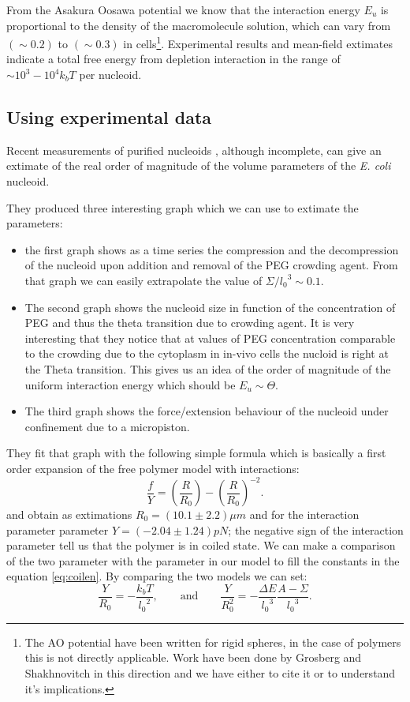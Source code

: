 \documentclass[12pt,a4paper,notitlepage]{article}
\newcommand{\ecoli}{\emph{E. coli}\xspace}
\begin{document}
From the Asakura Oosawa potential \cite{Asakura1958} we know that the
interaction energy $E_u$ is proportional to the density of the
macromolecule solution, which can vary from $(\sim 0.2)$ to $(\sim
0.3)$ in cells\footnote{
  The AO potential have been written for rigid spheres, in the case of
  polymers this is not directly applicable. Work have been done by
  Grosberg and Shakhnovitch in this direction\cite{Grosberg1982} and
  we have either to cite it or to understand it's implications.}.
Experimental results and mean-field extimates indicate a total free
energy from depletion interaction in the range of $\sim 10^3-10^4 k_b
T$ per nucleoid\cite{Kojima2006}.

\subsection{Using experimental data}
Recent measurements of purified nucleoids \cite{Pelletier2012}, although
incomplete, can give an extimate of the real order of magnitude of the
volume parameters of the \ecoli nucleoid.

They produced three interesting graph which we can use to extimate the
parameters:
\begin{itemize}
\item
the first graph shows as a time series the compression and
the decompression of the nucleoid upon addition and removal of the PEG
crowding agent. From that graph we can easily extrapolate the value of
$\Sigma / {l_0}^3 \sim 0.1$.
\item
The second graph shows the nucleoid size in function of the
concentration of PEG and thus the theta transition due to crowding
agent. It is very interesting that they notice that at values of PEG
concentration comparable to the crowding due to the cytoplasm in
in-vivo cells the nucloid is right at the Theta transition. This gives
us an idea of the order of magnitude of the uniform interaction energy
which should be $E_u \sim \Theta$.
\item
The third graph shows the force/extension behaviour of the nucleoid
under confinement due to a micropiston.
\end{itemize}

They fit that graph with the following simple formula which is
basically a first order expansion of the free polymer model with
interactions:
\begin{equation}
\frac{f}{Y} = \left(\frac{R}{R_0}\right) -
\left(\frac{R}{R_0}\right)^{-2}.
\label{eq:suckjun}
\end{equation}
and obtain as extimations $R_0 = (10.1 \pm 2.2)\mu m$ and for the
interaction parameter parameter $Y = (-2.04 \pm 1.24) pN$; the
negative sign of the interaction parameter tell us that the polymer is
in coiled state. We can make a comparison of the two parameter with
the parameter in our model to fill the constants in the equation
\ref{eq:coilen}. By comparing the two models we can set:
\begin{equation}
\frac{Y}{R_0} = - \frac{k_b T}{{l_0}^2},
\qquad \mathrm{and} \qquad
\frac{Y}{R_0^2} = - \frac{\Delta E}{{l_0}^3}\frac{A - \Sigma}{{l_0}^3}.
\end{equation}
\end{document}
